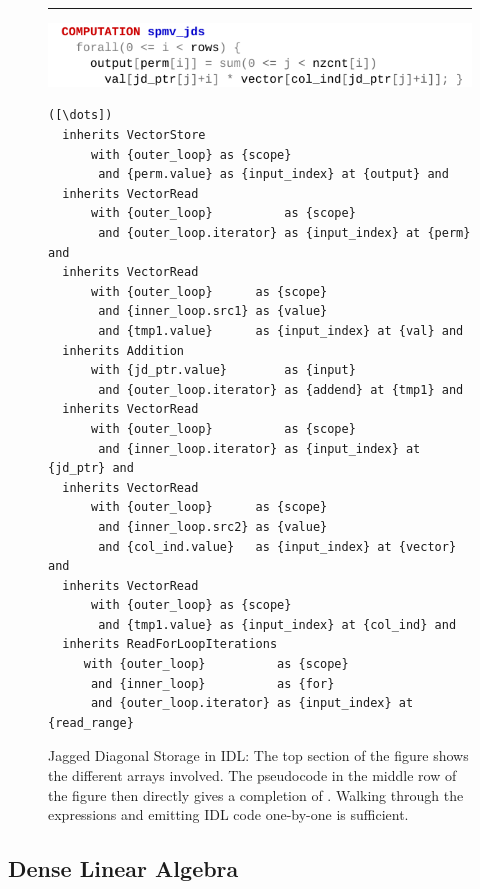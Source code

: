 \begin{figure}[p]
\vspace{0.8em}
\hrule
\vspace{0.3em}

\includegraphics[width=\linewidth]{figures/spmvjdswhat.pdf}
\vspace{-1.5em}
\begin{lstlisting}[language=IDL,firstnumber=7]
([\dots])
  inherits VectorStore
      with {outer_loop} as {scope}
       and {perm.value} as {input_index} at {output} and
  inherits VectorRead
      with {outer_loop}          as {scope}
       and {outer_loop.iterator} as {input_index} at {perm} and
  inherits VectorRead
      with {outer_loop}      as {scope}
       and {inner_loop.src1} as {value}
       and {tmp1.value}      as {input_index} at {val} and
  inherits Addition
      with {jd_ptr.value}        as {input}
       and {outer_loop.iterator} as {addend} at {tmp1} and
  inherits VectorRead
      with {outer_loop}          as {scope}
       and {inner_loop.iterator} as {input_index} at {jd_ptr} and
  inherits VectorRead
      with {outer_loop}      as {scope}
       and {inner_loop.src2} as {value}
       and {col_ind.value}   as {input_index} at {vector} and
  inherits VectorRead
      with {outer_loop} as {scope}
       and {tmp1.value} as {input_index} at {col_ind} and
  inherits ReadForLoopIterations
     with {outer_loop}          as {scope}
      and {inner_loop}          as {for}
      and {outer_loop.iterator} as {input_index} at {read_range}
\end{lstlisting}
\caption{Jagged Diagonal Storage in IDL:
         The top section of the figure shows the different arrays involved.
         The pseudocode in the middle row of the
         figure then directly gives a completion of .
         Walking through the expressions and emitting IDL code one-by-one is
         sufficient.}
\label{jds_lilacwhat_fig}
\end{figure}

\subsection{Dense Linear Algebra}

